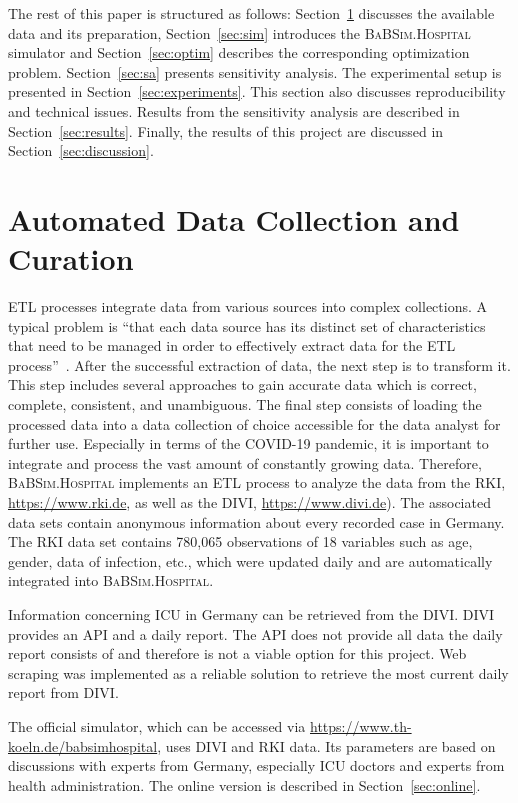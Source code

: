 \documentclass[conference]{IEEEtran}
\newcommand{\babsimhospital}{\textsc{BaBSim.Hospital}\xspace}
\begin{document}
The rest of this paper is structured as follows: 
Section~\ref{sec:data} discusses the available data and its preparation,
Section~\ref{sec:sim} introduces the \babsimhospital simulator and 
Section~\ref{sec:optim} describes the corresponding optimization problem. 
Section~\ref{sec:sa} presents sensitivity analysis.
The  experimental setup is presented in Section~\ref{sec:experiments}.
This section also discusses reproducibility and technical issues.
Results from the sensitivity analysis are described in Section~\ref{sec:results}.
Finally, the results of this project are discussed in Section~\ref{sec:discussion}.

\section{Automated Data Collection and Curation}\label{sec:data}
\gls{ETL} processes integrate data from various sources into complex collections. 
A typical problem is ``that each data source has its distinct set of characteristics 
that need to be managed in order to effectively extract data for the \gls{ETL} process''~\citep{ELSAPPAGH201191}. 
After the successful extraction of data, the next step is to transform it. 
This step includes several approaches to gain accurate data which is correct, complete, consistent, and unambiguous.  
The final step consists of loading the processed data into a data collection of choice accessible for the data analyst for further use.
Especially in terms of the COVID-19 pandemic, it is important to integrate and process the vast amount of constantly growing data. 
Therefore, \babsimhospital implements an \gls{ETL} process to analyze the data from the \gls{RKI}, \url{https://www.rki.de}, as well as the \gls{DIVI}, \url{https://www.divi.de}).
The associated data sets contain anonymous information about every recorded case in Germany. The \gls{RKI} data set contains 
780,065 observations of 18 variables such as age, gender, data of infection, etc., which were updated daily and are automatically integrated into \babsimhospital. 

Information concerning \gls{ICU} in Germany can be retrieved from the \gls{DIVI}.
\gls{DIVI} provides an API and a daily report. The API does not provide all data the daily report consists of and therefore is not a viable option for this project.
Web scraping was implemented as a reliable solution to retrieve the most current daily report from \gls{DIVI}.

The official simulator, which can be accessed via \url{https://www.th-koeln.de/babsimhospital}, uses \gls{DIVI} and \gls{RKI} data.
Its parameters are based on discussions with experts from Germany, especially \gls{ICU} doctors and experts from health administration.
The online version is described in Section~\ref{sec:online}.
\end{document}
